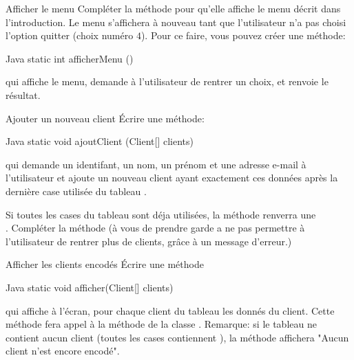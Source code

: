 \documentclass[a4paper,11pt]{article}
\begin{document}
 \begin{Exercice}{Afficher le menu}
 	    Compl\'eter la m\'ethode  pour qu'elle affiche le menu d\'ecrit dans l'introduction. Le menu s'affichera \`a nouveau tant que l'utilisateur n'a pas choisi l'option quitter (choix num\'ero $4$). Pour ce faire, vous pouvez cr\'eer une m\'ethode:
	    
     \begin{Code}{Java}
		   static int afficherMenu ()
     \end{Code}	    		
qui affiche le menu, demande \`a l'utilisateur de rentrer un choix, et renvoie le r\'esultat.
		
  \end{Exercice}
  
   \begin{Exercice}{Ajouter un nouveau client}
   	 		\'Ecrire une m\'ethode:
		\begin{Code}{Java}
		    static void ajoutClient (Client[] clients)
		\end{Code}
qui demande un identifant, un nom, un pr\'enom et une adresse e-mail \`a l'utilisateur et ajoute un nouveau client ayant exactement ces données apr\`es la derni\`ere case utilis\'ee du tableau .

Si toutes les cases du tableau sont d\'eja utilis\'ees, la m\'ethode renverra une \\. Compl\'eter la m\'ethode  (\`a vous de prendre garde a ne pas permettre \`a l'utilisateur de rentrer plus de  clients, grâce à un message d'erreur.)
				
\end{Exercice}
  
  	\begin{Exercice}{Afficher les clients encod\'es}
	\'Ecrire une m\'ethode
	
		\begin{Code}{Java}
		    static void afficher(Client[] clients)
		\end{Code}
	qui affiche \`a l'\'ecran, pour chaque client du tableau  les donn\'es du client. Cette m\'ethode fera appel \`a la m\'ethode  de la classe . Remarque: si le tableau ne contient aucun client (toutes les cases contiennent ), la m\'ethode affichera "Aucun client n'est encore encod\'e".
		
	\end{Exercice}
	
\end{document}
